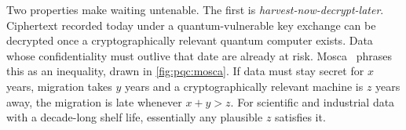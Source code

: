 Two properties make waiting untenable. The first is \emph{harvest-now-decrypt-later}. Ciphertext recorded today under a quantum-vulnerable key exchange can be decrypted once a cryptographically relevant quantum computer exists. Data whose confidentiality must outlive that date are already at risk. Mosca~\cite{mosca2018ready} phrases this as an inequality, drawn in \cref{fig:pqc:mosca}. If data must stay secret for $x$ years, migration takes $y$ years and a cryptographically relevant machine is $z$ years away, the migration is late whenever $x+y>z$. For scientific and industrial data with a decade-long shelf life, essentially any plausible $z$ satisfies it.

